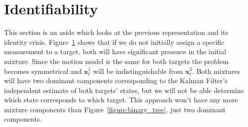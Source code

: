 \section{Identifiability}
\label{section:identifiability}
This section is an aside which looks at the previous representation and its identity crisis. Figure~\ref{section:identifiability} shows that if we do not initially assign a specific measurement to a target, both will have significant presence in the initial mixture. Since the motion model is the same for both targets the problem becomes symmetrical and $\pmb{x}_{t}^{1}$ will be indistinguishable from $\pmb{x}_{t}^{2}$. Both mixtures will have two dominant components corresponding to the Kalman Filter's independent estimate of both targets' states, but we will not be able determine which state corresponds to which target. This approach won't have any more mixture components than Figure~\ref{figure:binary_tree}, just two dominant components.


